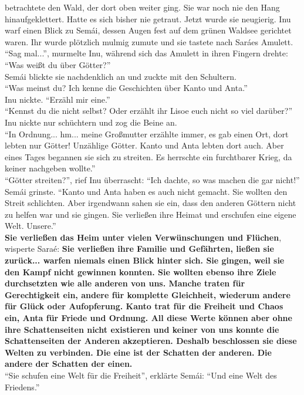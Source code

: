 betrachtete den Wald, der dort oben weiter ging. Sie war noch nie den Hang hinaufgeklettert. Hatte 
es sich bisher nie getraut. Jetzt wurde sie neugierig. Inu warf einen Blick zu Semái, dessen Augen 
fest auf dem grünen Waldsee gerichtet waren. 
Ihr wurde plötzlich mulmig zumute und sie tastete nach Saráes Amulett. \\
``Sag mal...'', murmelte Inu, während sich das Amulett in ihren Fingern drehte: ``Was weißt du über 
Götter?''\\
Semái blickte sie nachdenklich an und zuckte mit den Schultern. \\
``Was meinst du? Ich kenne die Geschichten über Kanto und Anta.''\\
Inu nickte. ``Erzähl mir eine.''\\
``Kennst du die nicht selbst?  Oder erzählt ihr Lisoe euch nicht so viel darüber?''\\
Inu nickte nur schüchtern und zog die Beine an. \\
``In Ordnung... hm... meine Großmutter erzählte immer, es gab einen Ort, dort lebten nur Götter! 
Unzählige Götter. Kanto und Anta lebten dort auch. Aber eines Tages begannen sie sich zu streiten. 
Es herrschte ein furchtbarer Krieg, da keiner nachgeben wollte.''\\
``Götter streiten?'', rief Inu überrascht: ``Ich dachte, so was machen die gar nicht!''\\
Semái grinste. ``Kanto und Anta haben es auch nicht gemacht. Sie wollten den Streit schlichten. 
Aber irgendwann sahen sie ein, dass den anderen Göttern nicht zu helfen war und sie gingen. Sie 
verließen ihre Heimat und erschufen eine eigene Welt. Unsere.''\\
\textbf{Sie verließen das Heim unter vielen Verwünschungen und Flüchen}, wisperte Saraé: 
\textbf{Sie verließen ihre Familie und Gefährten, ließen sie zurück... warfen niemals einen Blick 
hinter sich. Sie gingen, weil sie den Kampf nicht gewinnen konnten. Sie wollten ebenso ihre Ziele 
durchsetzten wie alle anderen von uns. Manche traten für Gerechtigkeit ein, andere für komplette 
Gleichheit, wiederum andere für Glück oder Aufopferung. Kanto trat für die Freiheit und Chaos ein, 
Anta für Friede und Ordnung. All diese Werte können aber ohne ihre Schattenseiten nicht existieren 
und keiner von uns konnte die Schattenseiten der Anderen akzeptieren. Deshalb beschlossen sie diese 
Welten zu verbinden. Die eine ist der Schatten der anderen. Die andere der Schatten der einen.}\\
``Sie schufen eine Welt für die Freiheit'', erklärte Semái: ``Und eine Welt des Friedens.''\\
